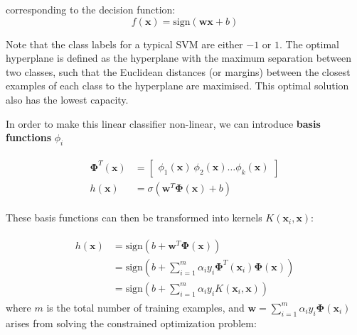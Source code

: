\documentclass[12pt,a4paper,twoside,openright]{report}
\renewcommand{\vec}[1]{\mathbf{#1}}
\begin{document}
corresponding to the decision function:
\begin{equation}
f(\vec{x}) = \text{sign}(\vec{wx} + b)
\end{equation}

Note that the class labels for a typical SVM are either $-1$ or $1$.
The optimal hyperplane is defined as the hyperplane with the maximum separation
between two classes, such that the Euclidean distances (or margins) between the closest examples of each class
to the hyperplane are maximised. This optimal solution also has the lowest capacity.

In order to make this linear classifier non-linear, we can introduce \textbf{basis functions} $\phi_i$\cite{Holden18}

\begin{align}
\begin{split}
	\vec{\Phi}^T(\vec{x}) &= 
	\begin{bmatrix}
	\phi_1(\vec{x})\ \phi_2(\vec{x}) \dots \phi_k(\vec{x})
	\end{bmatrix}\\
	h(\vec{x}) &= \sigma (\vec{w}^T\vec{\Phi}(\vec{x}) + b)
\end{split}
\end{align}

These basis functions can then be transformed into kernels $K(\vec{x}_i,\vec{x})$:

\begin{align}
\begin{split}
	h(\vec{x}) &= \text{sign}(b + \vec{w}^T\vec{\Phi}(\vec{x}))\\
	&=\text{sign}(b + \sum_{i=1}^m \alpha_iy_i\vec{\Phi}^T(\vec{x}_i)\vec{\Phi}(\vec{x}))\\
	&=\text{sign}(b + \sum_{i=1}^m \alpha_iy_i K(\vec{x}_i,\vec{x}))
\end{split}
\end{align}
where $m$ is the total number of training examples, and $\vec{w} = \sum_{i=1}^m \alpha_iy_i\vec{\Phi}(\vec{x}_i)$
arises from solving
the constrained optimization problem:\\
\end{document}
